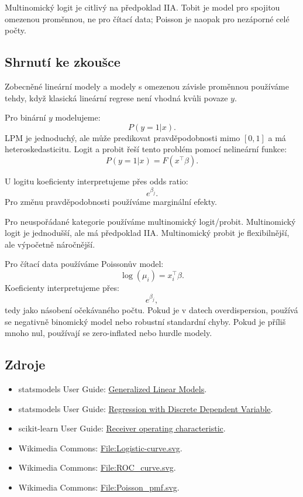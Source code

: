 Multinomický logit je citlivý na předpoklad IIA. Tobit je model pro spojitou omezenou proměnnou, ne pro
čítací data; Poisson je naopak pro nezáporné celé počty.

\subsection{Shrnutí ke zkoušce}

Zobecněné lineární modely a modely s omezenou závisle proměnnou používáme tehdy, když klasická lineární
regrese není vhodná kvůli povaze $y$.

Pro binární $y$ modelujeme:
\[
P(y=1|x).
\]
LPM je jednoduchý, ale může predikovat pravděpodobnosti mimo $[0,1]$ a má heteroskedasticitu. Logit a probit
řeší tento problém pomocí nelineární funkce:
\[
P(y=1|x)=F(x^\top\beta).
\]

U logitu koeficienty interpretujeme přes odds ratio:
\[
e^{\beta_j}.
\]
Pro změnu pravděpodobnosti používáme marginální efekty.

Pro neuspořádané kategorie používáme multinomický logit/probit. Multinomický logit je jednodušší, ale má
předpoklad IIA. Multinomický probit je flexibilnější, ale výpočetně náročnější.

Pro čítací data používáme Poissonův model:
\[
\log(\mu_i)=x_i^\top\beta.
\]
Koeficienty interpretujeme přes:
\[
e^{\beta_j},
\]
tedy jako násobení očekávaného počtu. Pokud je v datech overdispersion, používá se negativně binomický
model nebo robustní standardní chyby. Pokud je příliš mnoho nul, používají se zero-inflated nebo hurdle
modely.

\subsection{Zdroje}
\begin{itemize}
    \item statsmodels User Guide:
    \href{https://www.statsmodels.org/stable/glm.html}{Generalized Linear Models}.
    \item statsmodels User Guide:
    \href{https://www.statsmodels.org/stable/discretemod.html}{Regression with Discrete Dependent Variable}.
    \item scikit-learn User Guide:
    \href{https://scikit-learn.org/stable/modules/model\_evaluation.html\#roc-metrics}{Receiver operating characteristic}.
    \item Wikimedia Commons:
    \href{https://commons.wikimedia.org/wiki/File:Logistic-curve.svg}{File:Logistic-curve.svg}.
    \item Wikimedia Commons:
    \href{https://commons.wikimedia.org/wiki/File:ROC\_curve.svg}{File:ROC\_curve.svg}.
    \item Wikimedia Commons:
    \href{https://commons.wikimedia.org/wiki/File:Poisson\_pmf.svg}{File:Poisson\_pmf.svg}.
\end{itemize}



\newpage
